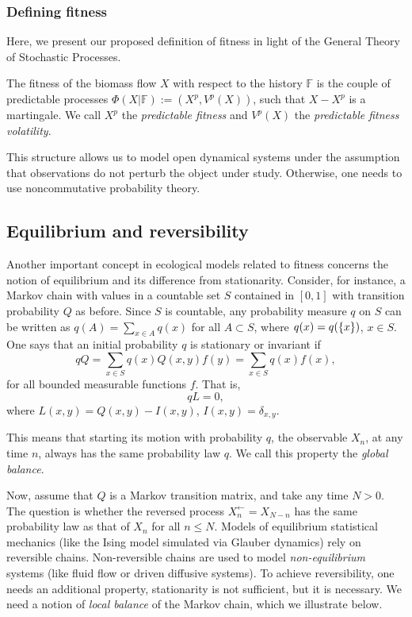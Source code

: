 \documentclass[12pt]{article}
\begin{document}
\subsubsection{Defining fitness}
Here, we present our proposed definition of fitness in light of the General Theory of Stochastic Processes.

\begin{defi}
    The fitness of the biomass flow $X$ with respect to the history $\mathbb{F}$ is the couple of predictable processes $\Phi(X|\mathbb{F}):=(X^p,V^p(X))$, such that $X-X^p$ is a martingale. We call $X^p$ the \textit{predictable fitness} and $V^p(X)$ the \textit{predictable fitness volatility}.
\end{defi}
This structure allows us to model open dynamical systems under the assumption that observations do not perturb the object under study. Otherwise, one needs to use noncommutative probability theory. 

\subsection{Equilibrium and reversibility}
Another important concept in ecological models related to fitness concerns the notion of equilibrium and its difference from stationarity. Consider, for instance, a Markov chain with values in a countable set $S$ contained in $[0,1]$ with transition probability $Q$ as before. Since $S$ is countable, any probability measure $q$ on $S$ can be written as $q(A)=\sum_{x\in A}q(x)$ for all $A\subset S$, where $q(x)=q(\left\{x\right\})$, $x\in S$. One says that an initial probability $q$ is stationary or invariant if 
\begin{equation}\label{stationary}
    qQ=\sum_{x\in S}q(x)Q(x,y)f(y)=\sum_{x\in S}q(x)f(x),
\end{equation}
for all bounded measurable functions $f$. That is,
\[qL=0,\]
where $L(x,y)=Q(x,y)-I(x,y)$, $I(x,y)=\delta_{x,y}$.

This means that starting its motion with probability $q$, the observable $X_n$, at any time $n$, always has the same probability law $q$. We call this property the \textit{global balance}. 

Now, assume that $Q$ is a Markov transition matrix, and take any time $N>0$. The question is whether the reversed process $X^{\leftarrow}_n=X_{N-n}$ has the same probability law as that of $X_n$ for all $n\leq N$. Models of equilibrium statistical mechanics (like the Ising model simulated via Glauber dynamics) rely on reversible chains. Non-reversible chains are used to model \textit{non-equilibrium} systems (like fluid flow or driven diffusive systems). To achieve reversibility, one needs an additional property, stationarity is not sufficient, but it is necessary. We need a notion of \textit{local balance} of the Markov chain, which we illustrate below. 
\end{document}
